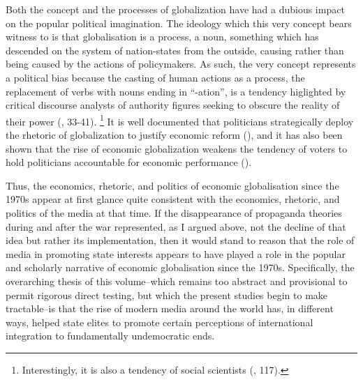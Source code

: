 Both the concept and the processes of globalization have had a dubious impact on the popular
political imagination. The ideology which this very concept bears witness to is that globalisation
is a process, a noun, something which has descended on the system of nation-states from the outside,
causing rather than being caused by the actions of policymakers. As such, the very concept
represents a political bias because the casting of human actions as a process, the replacement of
verbs with nouns ending in ``-ation'', is a tendency higlighted by critical discourse analysts of
authority figures seeking to obscure the reality of their power (\citealt{fowler1979language}, 33-41).
\footnote{Interestingly, it is also a tendency of social scientists (\citealt{billig2013learn}, 117).} It is well
documented that politicians strategically deploy the rhetoric of globalization to justify economic
reform (\citealt{Hay:2011dh}), and it has also been shown that the rise of economic globalization
weakens the tendency of voters to hold politicians accountable for economic performance
(\citealt{Hellwig:2007gn,Hellwig:2007jr}).

Thus, the economics, rhetoric, and politics of economic globalisation since the 1970s appear at
first glance quite consistent with the economics, rhetoric, and politics of the media at that time.
If the disappearance of propaganda theories during and after the war represented, as I argued above,
not the decline of that idea but rather its implementation, then it would stand to reason that the
role of media in promoting state interests appears to have played a role in the popular and
scholarly narrative of economic globalisation since the 1970s. Specifically, the overarching thesis
of this volume--which remains too abstract and provisional to permit rigorous direct testing, but
which the present studies begin to make tractable--is that the rise of modern media around the world
has, in different ways, helped state elites to promote certain perceptions of international
integration to fundamentally undemocratic ends.
